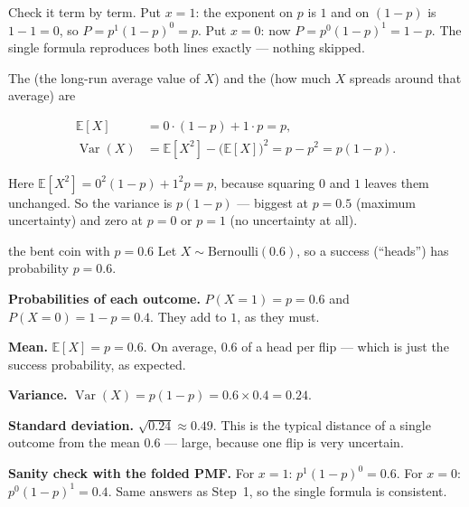Check it term by term. Put $x = 1$: the exponent on $p$ is $1$ and on $(1-p)$ is
$1-1 = 0$, so $P = p^{1}(1-p)^{0} = p$. Put $x = 0$: now $P = p^{0}(1-p)^{1} = 1-p$.
The single formula reproduces both lines exactly --- nothing skipped.

The  (the long-run average value of $X$) and the  (how
much $X$ spreads around that average) are

\begin{align}
  \mathbb{E}[X] &= 0\cdot(1-p) + 1\cdot p = p, \\
  \operatorname{Var}(X) &= \mathbb{E}[X^2] - \big(\mathbb{E}[X]\big)^2
     = p - p^2 = p(1-p).
\end{align}

Here $\mathbb{E}[X^2] = 0^2(1-p) + 1^2 p = p$, because squaring $0$ and $1$ leaves
them unchanged. So the variance is $p(1-p)$ --- biggest at $p = 0.5$ (maximum
uncertainty) and zero at $p = 0$ or $p = 1$ (no uncertainty at all).

\begin{worked}{the bent coin with $p = 0.6$}
Let $X \sim \text{Bernoulli}(0.6)$, so a success (``heads'') has probability
$p = 0.6$.
\begin{steps}
  \item \textbf{Probabilities of each outcome.}
        $P(X=1) = p = 0.6$ and $P(X=0) = 1-p = 0.4$. They add to $1$, as they
        must.
  \item \textbf{Mean.} $\mathbb{E}[X] = p = 0.6$. On average, $0.6$ of a head per
        flip --- which is just the success probability, as expected.
  \item \textbf{Variance.} $\operatorname{Var}(X) = p(1-p) = 0.6 \times 0.4 = 0.24$.
  \item \textbf{Standard deviation.} $\sqrt{0.24} \approx 0.49$. This is the
        typical distance of a single outcome from the mean $0.6$ --- large,
        because one flip is very uncertain.
  \item \textbf{Sanity check with the folded PMF.} For $x = 1$:
        $p^{1}(1-p)^{0} = 0.6$. For $x = 0$: $p^{0}(1-p)^{1} = 0.4$. Same answers
        as Step~1, so the single formula is consistent.
\end{steps}
\end{worked}

